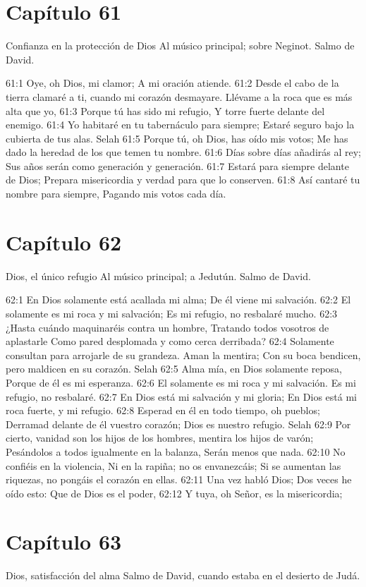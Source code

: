 \section*{Capítulo 61}
Confianza en la protección de Dios 
Al músico principal; sobre Neginot. Salmo de David. 
 
61:1 Oye, oh Dios, mi clamor; 
A mi oración atiende. 
61:2 Desde el cabo de la tierra clamaré a ti, cuando mi corazón desmayare. 
Llévame a la roca que es más alta que yo, 
61:3 Porque tú has sido mi refugio, 
Y torre fuerte delante del enemigo. 
61:4 Yo habitaré en tu tabernáculo para siempre; 
Estaré seguro bajo la cubierta de tus alas. Selah 
61:5 Porque tú, oh Dios, has oído mis votos; 
Me has dado la heredad de los que temen tu nombre. 
61:6 Días sobre días añadirás al rey; 
Sus años serán como generación y generación. 
61:7 Estará para siempre delante de Dios; 
Prepara misericordia y verdad para que lo conserven. 
61:8 Así cantaré tu nombre para siempre, 
Pagando mis votos cada día. 
\section*{Capítulo 62}
Dios, el único refugio 
Al músico principal; a Jedutún. Salmo de David. 
 
62:1 En Dios solamente está acallada mi alma; 
De él viene mi salvación. 
62:2 El solamente es mi roca y mi salvación; 
Es mi refugio, no resbalaré mucho. 
62:3 ¿Hasta cuándo maquinaréis contra un hombre, 
Tratando todos vosotros de aplastarle 
Como pared desplomada y como cerca derribada? 
62:4 Solamente consultan para arrojarle de su grandeza. 
Aman la mentira; 
Con su boca bendicen, pero maldicen en su corazón. Selah 
62:5 Alma mía, en Dios solamente reposa, 
Porque de él es mi esperanza. 
62:6 El solamente es mi roca y mi salvación. 
Es mi refugio, no resbalaré. 
62:7 En Dios está mi salvación y mi gloria; 
En Dios está mi roca fuerte, y mi refugio. 
62:8 Esperad en él en todo tiempo, oh pueblos; 
Derramad delante de él vuestro corazón; 
Dios es nuestro refugio. Selah 
62:9 Por cierto, vanidad son los hijos de los hombres, mentira los hijos de varón; 
Pesándolos a todos igualmente en la balanza, 
Serán menos que nada. 
62:10 No confiéis en la violencia, 
Ni en la rapiña; no os envanezcáis; 
Si se aumentan las riquezas, no pongáis el corazón en ellas. 
62:11 Una vez habló Dios; 
Dos veces he oído esto: 
Que de Dios es el poder, 
62:12 Y tuya, oh Señor, es la misericordia;  

\section*{Capítulo 63}
Dios, satisfacción del alma 
Salmo de David, cuando estaba en el desierto de Judá. 
 
